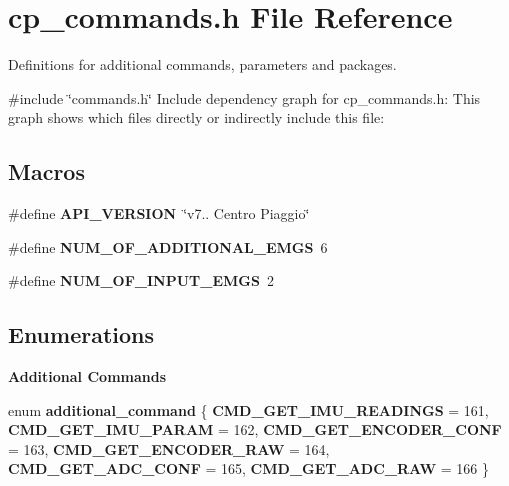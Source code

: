 \section{cp\+\_\+commands.\+h File Reference}
\label{cp__commands_8h}


Definitions for additional commands, parameters and packages.  


{\ttfamily \#include \char`\"{}commands.\+h\char`\"{}}\newline
Include dependency graph for cp\+\_\+commands.\+h\+:
This graph shows which files directly or indirectly include this file\+:
\subsection*{Macros}
\begin{DoxyCompactItemize}
\item 
\mbox{\label{cp__commands_8h_ad97188edfdd667de971027b35330fa41}} 
\#define {\bfseries A\+P\+I\+\_\+\+V\+E\+R\+S\+I\+ON}~\char`\"{}v7.. Centro Piaggio\char`\"{}
\item 
\#define \textbf{ N\+U\+M\+\_\+\+O\+F\+\_\+\+A\+D\+D\+I\+T\+I\+O\+N\+A\+L\+\_\+\+E\+M\+GS}~6
\item 
\mbox{\label{cp__commands_8h_a21ab5f0a6e4cb48bd320177c4f7aa078}} 
\#define {\bfseries N\+U\+M\+\_\+\+O\+F\+\_\+\+I\+N\+P\+U\+T\+\_\+\+E\+M\+GS}~2
\end{DoxyCompactItemize}
\subsection*{Enumerations}
\begin{Indent}\textbf{ Additional Commands}\par
\begin{DoxyCompactItemize}
\item 
\mbox{\label{cp__commands_8h_a8db8cb42d999da8754b30ab43259d6a3}} 
enum {\bfseries additional\+\_\+command} \{ \newline
{\bfseries C\+M\+D\+\_\+\+G\+E\+T\+\_\+\+I\+M\+U\+\_\+\+R\+E\+A\+D\+I\+N\+GS} = 161, 
{\bfseries C\+M\+D\+\_\+\+G\+E\+T\+\_\+\+I\+M\+U\+\_\+\+P\+A\+R\+AM} = 162, 
{\bfseries C\+M\+D\+\_\+\+G\+E\+T\+\_\+\+E\+N\+C\+O\+D\+E\+R\+\_\+\+C\+O\+NF} = 163, 
{\bfseries C\+M\+D\+\_\+\+G\+E\+T\+\_\+\+E\+N\+C\+O\+D\+E\+R\+\_\+\+R\+AW} = 164, 
\newline
{\bfseries C\+M\+D\+\_\+\+G\+E\+T\+\_\+\+A\+D\+C\+\_\+\+C\+O\+NF} = 165, 
{\bfseries C\+M\+D\+\_\+\+G\+E\+T\+\_\+\+A\+D\+C\+\_\+\+R\+AW} = 166
 \}
\end{DoxyCompactItemize}
\end{Indent}


